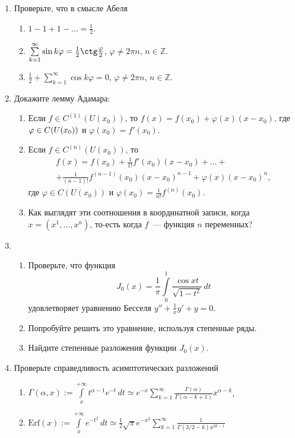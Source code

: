 \documentclass[a4paper]{article}
\newcommand*{\p}[1]{#1\nobreak\discretionary{}{\hbox{$\mathsurround=0pt #1$}}{}}
\begin{document}
\begin{enumerate}
  \item Проверьте, что в смысле Абеля
  \begin{enumerate}
    \item $1-1+1-\ldots = \frac{1}{2}$.
    \item $\sum\limits_{k=1}^\infty\sin k\varphi =
    \frac{1}{2}\ctg\frac{\varphi}{2}$, $\varphi\neq 2\pi n$, $n\in
    \mathbb{Z}$.
    \item $\frac{1}{2}+\sum\limits_{k=1}^\infty\cos k\varphi=0$, $\varphi\neq 2\pi n$,
     $n\in\mathbb{Z}$.
  \end{enumerate}
  \item Докажите лемму Адамара:
  \begin{enumerate}
    \item Если $f\in C^{(1)}(U(x_0))$, то
    $f(x)=f(x_0)+\varphi(x)(x-x_0)$, где $\varphi\p\in C(U(x_0))$ и
    $\varphi(x_0)=f'(x_0)$.
    \item Если $f\in C^{(n)}(U(x_0))$, то
    \begin{multline*}
    f(x)=f(x_0)+\frac{1}{1!}f'(x_0)(x-x_0)+\ldots+\\
    +\frac{1}{(n-1)!}f^{(n-1)}(x_0)(x-x_0)^{n-1}+\varphi(x)(x-x_0)^n,
    \end{multline*}
    где $\varphi\in C(U(x_0))$ и
    $\varphi(x_0)=\frac{1}{n!}f^{(n)}(x_0)$.
    \item Как выглядят эти соотношения в координатной записи, когда
    $x=(x^1,\ldots,x^n)$, то-есть когда $f$~--- функция $n$
    переменных?
  \end{enumerate}
  \item \begin{enumerate}
          \item Проверьте, что функция $$J_0(x)=\frac{1}{\pi}\int
          \limits_0^1\!\frac{\cos xt}{\sqrt{1-t^2}}\,dt$$
          удовлетворяет уравнению Бесселя $y''+\frac{1}{x}y'+y=0$.
          \item Попробуйте решить это уравнение, используя степенные
          ряды.
          \item Найдите степенные разложения функции $J_0(x)$.
        \end{enumerate}
  \item Проверьте справедливость асимптотических разложений
  \begin{enumerate}
    \item $\Gamma(\alpha,x):= \int\limits_x^{+\infty}\!
    t^{\alpha-1}e^{-t}\,dt \simeq e^{-x}\sum\limits_{k=1}^\infty
    \frac{\Gamma(\alpha)}{\Gamma(\alpha-k+1)}x^{\alpha-k}$,
    \item $\mathrm{Erf}(x):= \int\limits_x^{+\infty}\! e^{-t^2}\,dt\simeq
    \frac{1}{2}\sqrt{\pi}e^{-x^2}\sum\limits_{k=1}^\infty
    \frac{1}{\Gamma(3/2-k)x^{2k-1}}$


\end{enumerate}
\end{enumerate}
\end{document}
